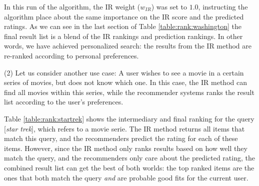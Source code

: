 In this run of the algorithm, the IR weight ($w_{IR}$) was set to $1.0$,
instructing the algorithm place about the same importance on the IR score
and the predicted ratings. As we can see in the last section of 
Table \ref{table:rank:washington} the final result list is a blend
of the IR rankings and prediction rankings.
In other words, we have achieved personalized search: the results
from the IR method are re-ranked according to personal preferences.


(2) Let us consider another use case:
A user wishes to see a movie in a certain series of movies,
but does not know which one. In this case, the IR method can find all movies within this series,
while the recommender systems ranks the result list according to the user's preferences.

Table \ref{table:rank:startrek} shows the intermediary and final ranking
for the query [\emph{star trek}], which refers to a movie serie.
The IR method returns all items that match this query,
and the recommenders predict the rating for each of these items.
However, since the IR method only ranks results based on how well they match the query,
and the recommenders only care about the predicted rating, the combined result
list can get the best of both worlds:
the top ranked items are the ones that both match the query \emph{and}
are probable good fits for the current user.


